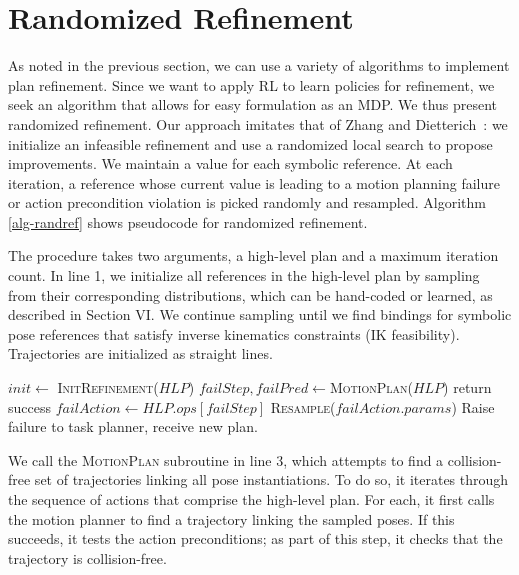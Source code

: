 \section{Randomized Refinement}
As noted in the previous section, we can use a variety of algorithms to implement
plan refinement. Since we want to apply RL to learn policies for refinement,
we seek an algorithm that allows for easy formulation as an MDP. We thus present
randomized refinement. Our approach imitates that of Zhang and Dietterich~\cite{JobShopSched}:
we initialize an infeasible refinement and use a randomized local search to propose
improvements. We maintain a value for each symbolic reference.
At each iteration, a reference whose current value is leading to a motion planning failure or
action precondition violation is picked randomly and resampled.
Algorithm \ref{alg-randref} shows pseudocode for randomized refinement.

The procedure takes two arguments, a high-level plan and a maximum
iteration count. In line 1, we initialize all references in the high-level plan by sampling
from their corresponding distributions, which can be hand-coded or learned, as described in Section VI. We continue sampling
until we find bindings for symbolic pose references that satisfy
inverse kinematics constraints (IK feasibility). Trajectories are
initialized as straight lines.

\begin{algorithm}[t]
\begin{small}
  \SetAlgoLined
  \DontPrintSemicolon
   {
  \nl $init \leftarrow$ \textsc{InitRefinement}($HLP$)\;
  \nl {} {
  \nl $failStep, failPred \leftarrow $\textsc{MotionPlan}($HLP$)\;
  \nl {} {
  \nl return success }
  \nl {} {
  \nl $failAction \leftarrow HLP.ops[failStep]$\;
  \nl \textsc{Resample}($failAction.params$) }
  \nl {} }
  \nl Raise failure to task planner, receive new plan. }
\end{small}
\label{alg-randref}
\vspace{-1.5 em}
\end{algorithm}

We call the \textsc{MotionPlan} subroutine in line 3, which attempts to
find a collision-free set of trajectories linking all pose instantiations.
To do so, it iterates through the sequence of actions that comprise the high-level plan.
For each, it first calls the motion planner to find a trajectory
linking the sampled poses. If this succeeds, it tests the action preconditions;
as part of this step, it checks that the trajectory is collision-free.

